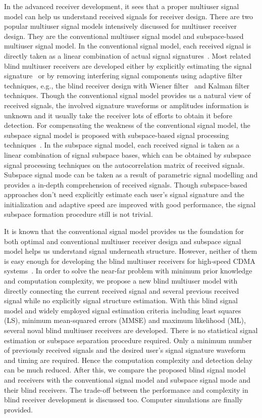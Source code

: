 \documentclass[a4paper,10pt,fleqn, twocolumn]{IEEETran}
\begin{document}
In the advanced receiver development, it sees that a proper
multiuser signal model can help us understand received signals for
receiver design. There are two popular multiuser signal models
intensively discussed for multiuser receiver design. They are the
conventional multiuser signal model and subspace-based multiuser
signal model. In the conventional signal model, each received
signal is directly taken as a linear combination of actual signal
signatures~\cite{Verd98,Honi95,Zhang02}. Most related blind
multiuser receivers are developed either by explicitly estimating
the signal signature~\cite{Torl97} or by removing interfering
signal components using adaptive filter techniques, e.g., the
blind receiver design with Wiener filter~\cite{Honi95} and Kalman
filter~\cite{Zhang02} techniques. Though the conventional signal
model provides us a natural view of received signals, the involved
signature waveforms or amplitudes information is unknown and it
usually take the receiver lots of efforts to obtain it before
detection. For compensating the weakness of the conventional
signal model, the subspace signal model is proposed with
subspace-based signal processing techniques~\cite{Wang98}. In the
subspace signal model, each received signal is taken as a linear
combination of signal subspace bases, which can be obtained by
subspace signal processing techniques on the autocorrelation
matrix of received signals. Subspace signal mode can be taken as a
result of parametric signal modelling and provides a in-depth
comprehension of received signals. Though subspace-based
approaches don't need explicitly estimate each user's signal
signature and the initialization and adaptive speed are improved
with good performance, the signal subspace formation procedure
still is not trivial.

It is known that the conventional signal model provides us the
foundation for both optimal and conventional multiuser receiver
design and subspace signal model helps us understand signal
underneath structure. However, neither of them is easy enough for
developing the blind multiuser receivers for high-speed CDMA
systems~\cite{Andr05}. In order to solve the near-far problem with
minimum prior knowledge and computation complexity, we propose a
new blind multiuser model with directly connecting the current
received signal and several previous received signal while no
explicitly signal structure estimation. With this blind signal
model and widely employed signal estimation criteria including
least squares (LS), minimum mean-squared errors (MMSE) and maximum
likelihood (ML), several noval blind multiuser receivers are
developed. There is no statistical signal estimation or subspace
separation procedure required. Only a minimum number of previously
received signals and the desired user's signal signature waveform
and timing are required. Hence the computation complexity and
detection delay can be much reduced. After this, we compare the
proposed blind signal model and receivers with the conventional
signal model and subspace signal mode and their blind receivers.
The trade-off between the performance and complexity in blind
receiver development is discussed too. Computer simulations are
finally provided.
\end{document}
